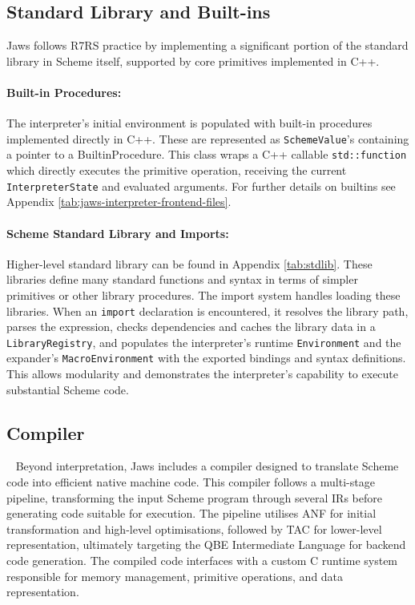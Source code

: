 \documentclass[final]{cmpreport_02}
\begin{document}
\subsection{Standard Library and Built-ins} %
Jaws follows R7RS practice by implementing a significant portion of the standard library in Scheme itself, supported by core primitives implemented in C++.
\paragraph{Built-in Procedures:} The interpreter's initial environment is populated with built-in procedures implemented directly in C++. These are represented as \texttt{SchemeValue}'s containing a pointer to a BuiltinProcedure. This class wraps a C++ callable \linebreak\texttt{std::function} which directly executes the primitive operation, receiving the current \texttt{InterpreterState} and evaluated arguments. For further details on builtins see Appendix \ref{tab:jaws-interpreter-frontend-files}.
\paragraph{Scheme Standard Library and Imports:} Higher-level standard library can be found in Appendix \ref{tab:stdlib}. These libraries define many standard functions and syntax in terms of simpler primitives or other library procedures. The import system handles loading these libraries. When an \texttt{import} declaration is encountered, it resolves the library path, parses the expression, checks dependencies and caches the library data in a \texttt{LibraryRegistry}, and populates the interpreter's runtime \texttt{Environment} and the expander's \texttt{MacroEnvironment} with the exported bindings and syntax definitions. This allows modularity and demonstrates the interpreter's capability to execute substantial Scheme code.

\subsection{Compiler} 
Beyond interpretation, Jaws includes a compiler designed to translate Scheme code into efficient native machine code. This compiler follows a multi-stage pipeline, transforming the input Scheme program through several IRs before generating code suitable for execution. The pipeline utilises ANF for initial transformation and high-level optimisations, followed by TAC for lower-level representation, ultimately targeting the QBE Intermediate Language for backend code generation. The compiled code interfaces with a custom C runtime system responsible for memory management, primitive operations, and data representation.
\end{document}
